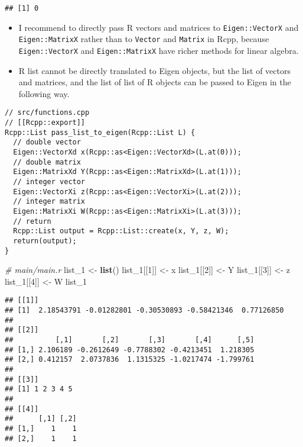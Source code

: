\documentclass[
]{book}
\newenvironment{Shaded}{\begin{snugshade}}{\end{snugshade}}
\newcommand{\CommentTok}[1]{\textcolor[rgb]{0.56,0.35,0.01}{\textit{#1}}}
\newcommand{\DecValTok}[1]{\textcolor[rgb]{0.00,0.00,0.81}{#1}}
\newcommand{\KeywordTok}[1]{\textcolor[rgb]{0.13,0.29,0.53}{\textbf{#1}}}
\newcommand{\NormalTok}[1]{#1}
\newcommand{\StringTok}[1]{\textcolor[rgb]{0.31,0.60,0.02}{#1}}
\begin{document}
\begin{verbatim}
## [1] 0
\end{verbatim}

\begin{itemize}
\item
  I recommend to directly pass R vectors and matrices to \texttt{Eigen::VectorX} and \texttt{Eigen::MatrixX} rather than to \texttt{Vector} and \texttt{Matrix} in Rcpp, because \texttt{Eigen::VectorX} and \texttt{Eigen::MatrixX} have richer methods for linear algebra.
\item
  R list cannot be directly translated to Eigen objects, but the list of vectors and matrices, and the list of list of R objects can be passed to Eigen in the following way.
\end{itemize}

\begin{verbatim}
// src/functions.cpp
// [[Rcpp::export]]
Rcpp::List pass_list_to_eigen(Rcpp::List L) {
  // double vector
  Eigen::VectorXd x(Rcpp::as<Eigen::VectorXd>(L.at(0)));
  // double matrix
  Eigen::MatrixXd Y(Rcpp::as<Eigen::MatrixXd>(L.at(1)));
  // integer vector
  Eigen::VectorXi z(Rcpp::as<Eigen::VectorXi>(L.at(2)));
  // integer matrix
  Eigen::MatrixXi W(Rcpp::as<Eigen::MatrixXi>(L.at(3)));
  // return
  Rcpp::List output = Rcpp::List::create(x, Y, z, W);
  return(output);
}
\end{verbatim}

\begin{Shaded}
\begin{Highlighting}[]
\CommentTok{# main/main.r}
\NormalTok{list_}\DecValTok{1}\NormalTok{ <-}\StringTok{ }\KeywordTok{list}\NormalTok{()}
\NormalTok{list_}\DecValTok{1}\NormalTok{[[}\DecValTok{1}\NormalTok{]] <-}\StringTok{ }\NormalTok{x}
\NormalTok{list_}\DecValTok{1}\NormalTok{[[}\DecValTok{2}\NormalTok{]] <-}\StringTok{ }\NormalTok{Y}
\NormalTok{list_}\DecValTok{1}\NormalTok{[[}\DecValTok{3}\NormalTok{]] <-}\StringTok{ }\NormalTok{z}
\NormalTok{list_}\DecValTok{1}\NormalTok{[[}\DecValTok{4}\NormalTok{]] <-}\StringTok{ }\NormalTok{W}
\NormalTok{list_}\DecValTok{1}
\end{Highlighting}
\end{Shaded}

\begin{verbatim}
## [[1]]
## [1]  2.18543791 -0.01282801 -0.30530893 -0.58421346  0.77126850
## 
## [[2]]
##          [,1]       [,2]       [,3]       [,4]      [,5]
## [1,] 2.106189 -0.2612649 -0.7788302 -0.4213451  1.218305
## [2,] 0.412157  2.0737836  1.1315325 -1.0217474 -1.799761
## 
## [[3]]
## [1] 1 2 3 4 5
## 
## [[4]]
##      [,1] [,2]
## [1,]    1    1
## [2,]    1    1
\end{verbatim}
\end{document}
